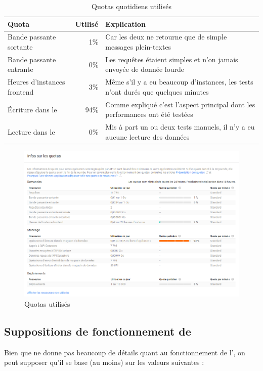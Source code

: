 \documentclass[french]{msereport}
\newcommand{\gae}{\brand{Google App Engine}}
\begin{document}
			\begin{table}[!h]
				\setlength\extrarowheight{3pt}
				\caption{Quotas quotidiens utilisés}
				\label{tab:quotas}
				\begin{tabularx}{\textwidth}{|l|r|X|}
					\hline
					\textbf{Quota}			& \textbf{Utilisé}	& \textbf{Explication} \\
					\hline
					Bande passante sortante				& 1\%	& Car les deux \eng{servlets} ne retourne que de simple messages plein-textes \\
					\hline
					Bande passante entrante 			& 0\%	& Les requêtes étaient simples et n'on jamais envoyée de donnée lourde \\
					\hline
					Heures d'instances frontend			& 3\%	& Même s'il y a eu beaucoup d'instances, les tests n'ont durés que quelques minutes \\
					\hline
					Écriture dans le \eng{datastore}	& 94\%	& Comme expliqué c'est l'aspect principal dont les performances ont été testées \\
					\hline
					Lecture dans le \eng{datastore}		& 0\%	& Mis à part un ou deux tests manuels, il n'y a eu aucune lecture des données \\
					\hline
				\end{tabularx}
			\end{table}
			
			\begin{figure}[!h]
				\label{quotas}
				\centering
				\includegraphics[width=\textwidth]{screen_quotas.png}
				\caption{Quotas utilisés}
			\end{figure}
			
		\clearpage
		\subsection{Suppositions de fonctionnement de \gae}
			Bien que  ne donne pas beaucoup de détails quant au fonctionnement de l', on peut supposer qu'il se base (au moins) sur les valeurs suivantes :
			
\end{document}
